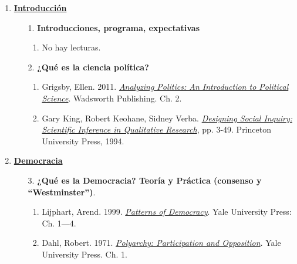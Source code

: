\documentclass[letterpaper]{article}
\begin{document}
\begin{enumerate}  
\addtocounter{enumi}{-1}
		\item \underline{{\bf Introducci\'on}}
					\begin{enumerate}
						\item[1.] {\bf Introducciones, programa, expectativas}
							\begin{enumerate}
								\item No hay lecturas.
							\end{enumerate}
					\end{enumerate}

			\begin{enumerate}
				
		\item[2.] {\bf ¿Qu\'e es la ciencia pol\'itica?}
					\begin{enumerate}
						\item Grigsby, Ellen. 2011. \href{https://github.com/hbahamonde/Ciencia_Politica_I/raw/master/Readings/Grigsby.pdf}{\emph{Analyzing Politics: An Introduction to Political Science}}. Wadsworth Publishing. Ch. 2.
						\item Gary King, Robert Keohane, Sidney Verba. \href{https://github.com/hbahamonde/Ciencia_Politica_I/raw/master/Readings/kkv.pdf}{\emph{Designing Social Inquiry: Scientific Inference in Qualitative Research}}, pp. 3-49. Princeton University Press, 1994.
					\end{enumerate}
			\end{enumerate}
		\item {\bf \underline{Democracia}}
			\begin{enumerate}
			
				\item[3.] {\bf ¿Qu\'e es la Democracia? Teor\'ia y Pr\'actica (consenso y ``Westminster'')}.
					\begin{enumerate}
						\item Lijphart, Arend. 1999. \href{https://github.com/hbahamonde/Ciencia_Politica_I/raw/master/Readings/Lijphart.pdf}{\emph{Patterns of Democracy}}. Yale University Press: Ch. 1---4.
						\item Dahl, Robert. 1971. \href{https://github.com/hbahamonde/Ciencia_Politica_I/raw/master/Readings/Polyarchy.pdf}{\emph{Polyarchy: Participation and Opposition}}. Yale University Press. Ch. 1.
					\end{enumerate}
			

\end{enumerate}
\end{enumerate}
\end{document}
